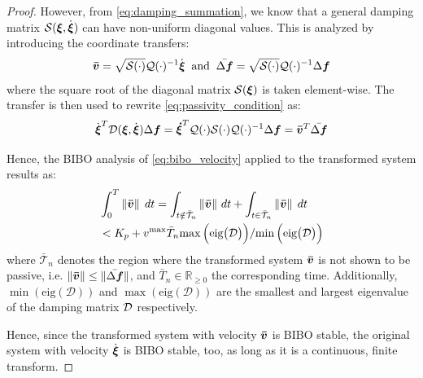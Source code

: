 \begin{proof}
However, from \eqref{eq:damping_summation}, we know that a general damping matrix $\mathcal{S}(\boldsymbol{\xi}, \dot{\boldsymbol{\xi}})$ can have non-uniform diagonal values. This is analyzed by introducing the coordinate transfers:
\begin{equation}
	\boldsymbol{\bar{v}} = \sqrt{\mathcal{S}(\cdot)} \mathcal{Q}(\cdot)^{-1} \dot{{\boldsymbol{\xi}}}
	\;\; \text{and} \;\;
	\bar{\Delta \boldsymbol{f}} = \sqrt{\mathcal{S}(\cdot)} \mathcal{Q}(\cdot)^{-1} \Delta \boldsymbol{f}
\end{equation}
where the square root of the diagonal matrix $\mathcal{S}({\boldsymbol{\xi}})$ is taken element-wise.
The transfer is then used to rewrite \eqref{eq:passivity_condition} as:
\begin{equation}
	\dot{\boldsymbol{\xi}}^T \mathcal{D}({\boldsymbol{\xi}}, \dot{\boldsymbol{\xi}}) \Delta \boldsymbol{f} = \boldsymbol{\dot \xi}^T \mathcal{Q}(\cdot) \mathcal{S}(\cdot) \mathcal{Q}(\cdot)^{-1} \Delta \boldsymbol{f} = \boldsymbol{\bar v}^T \bar{\Delta \boldsymbol{f}}
\end{equation}

Hence, the BIBO analysis of \eqref{eq:bibo_velocity} applied to the transformed system results as:
\begin{equation}
\begin{split}
	  & \int_{0}^{T} \left\| \boldsymbol{\bar v} \right\| \; dt   
	   = \int_{t \notin \bar{\mathcal{T}}_n} \left\| \boldsymbol{\bar v} \right\|  \, dt + \int_{t \in  \bar{\mathcal{T}}_n} \left\| \boldsymbol{\bar v} \right\| \;  dt  \\ 
   & < K_p + v^{\mathrm{max}} \bar T_n 
   {\max{\Bigl(\text{eig}\bigl(\mathcal{D} \bigr) \Bigr)}} 
   / {\min{\Bigl(\text{eig}\bigl(\mathcal{D} \bigr) \Bigr)}}
\end{split}
\end{equation}
where $\bar{\mathcal{T}}_n$ denotes the region where the transformed system $\boldsymbol{\bar v}$ is not shown to be passive, i.e. $\| \boldsymbol{\bar v} \| \leq \| \bar{\Delta \boldsymbol{f}} \|$, and $\bar T_n \in \mathbb{R}_{\geq 0}$ the corresponding time. Additionally, $\min{(\text{eig}(\mathcal{D}))}$ and $\max{(\text{eig}(\mathcal{D}))}$ are the smallest and largest eigenvalue of the damping matrix $\mathcal{D}$ respectively.

Hence, since the transformed system with velocity $\boldsymbol{\bar v}$ is BIBO stable, the original system with velocity $\dot{\boldsymbol{\xi}}$ is BIBO stable, too, as long as it is a continuous, finite transform. 
\end{proof}
